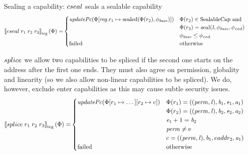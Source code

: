 \documentclass[a4paper]{article}
\newcommand{\sem}[1]{\left\llbracket #1 \right\rrbracket}
\newcommand{\tsem}[2][\Phi]{\sem{#2}_{\mathrm{trg}}(#1)}
\newcommand{\totherwise}{\text{otherwise }}
\newcommand{\targetcolor}[1]{\color{black}}
\newcommand{\trg}[1]{{\targetcolor{} #1}}
\newcommand{\zinstr}[1]{#1}
\newcommand{\threeinstr}[4]{
  \ifthenelse{\equal{#2#3#4}{}}
  {\zinstr{#1}}
  {\zinstr{#1} \; #2 \; #3 \; #4}
}
\newcommand{\tsplice}[3]{\threeinstr{\trg{splice}}{#1}{#2}{#3}}
\newcommand{\tcseal}[3]{\threeinstr{\trg{cseal}}{#1}{#2}{#3}}
\newcommand{\update}[2]{[#1 \mapsto #2]}
\newcommand{\shareddom}[1]{\mathrm{#1}}
\newcommand{\SealableCaps}{\shareddom{SealableCap}}
\newcommand{\perm}{\var{perm}}
\newcommand{\lin}{\var{l}}
\newcommand{\seal}[1]{\shareddom{seal}(#1)}
\newcommand{\sealed}[1]{\shareddom{sealed}(#1)}
\newcommand{\failed}{\mathrm{failed}}
\newcommand{\var}[1]{\mathit{#1}}
\newcommand{\reg}{\var{reg}}
\newcommand{\baddr}{\var{b}}
\newcommand{\eaddr}{\var{e}}
\newcommand{\aaddr}{\var{a}}
\newcommand{\plainperm}[1]{\mathrm{#1}}
\newcommand{\enter}{\plainperm{e}}
\newcommand{\plainfun}[2]{
  \ifthenelse{\equal{#2}{}}
  {\mathit{#1}}
  {\mathit{#1}(#2)}
}
\newcommand{\updPcAddr}[1]{\plainfun{updatePc}{#1}}
\begin{document}
Sealing a capability: $\tcseal{}{}{}$ seals a sealable capability
\begin{align*}
  \tsem{\tcseal{r_1}{r_2}{r_3}} = & 
                                    \begin{cases}
                                      \updPcAddr{\Phi\update{\reg.r_1}{\sealed{\Phi(r_2),\phi_{\var{base}}}}} &
                                      \arraycolsep=0pt
                                      \begin{array}[t]{l}
                                        \Phi(r_2) \in \SealableCaps \text{ and } \\
                                        \Phi(r_3) = \seal{\lin,\phi_{\var{base}},\phi_{\var{end}}} \\
                                        \phi_{\var{base}} \leq \phi_{\var{end}} %
                                      \end{array} \\
                                      \failed & \text{otherwise}
                                    \end{cases}
\end{align*}

$\tsplice{}{}{}$ we allow two capabilities to be spliced if the second one starts on the address after the first one ends. They must also agree on permission, globality and linearity (so we also allow non-linear capabilities to be spliced). We do, however, exclude enter capabilities as this may cause subtle security issues.
\begin{align*}
  \tsem{\tsplice{r_1}{r_2}{r_3}} = &
                                \begin{cases}
                                  \updPcAddr{\Phi\update{r_1}{\dots}\update{r_2}{c}} &
                                  \arraycolsep=0pt
                                  \begin{array}[t]{l}
                                    \Phi(r_1) = ((\perm, \lin), \baddr_1, \eaddr_1, \aaddr_1) \\
                                    \Phi(r_2) = ((\perm, \lin), \baddr_2, \eaddr_2, \aaddr_2) \\
                                    \eaddr_1 + 1 = \baddr_2 \\
                                    \perm \neq \enter \\
                                    c = ((\perm, \lin), \baddr_1, eaddr_2, \aaddr_1)
                                  \end{array}
                                  \\
                                  \failed & \totherwise
                                \end{cases}
\end{align*}
\end{document}
